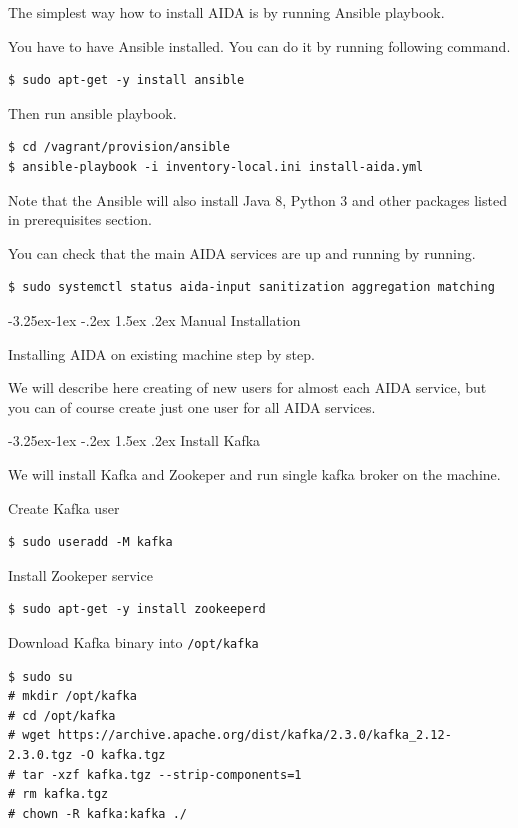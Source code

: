 \documentclass[a4paper]{article} %
\makeatletter
\renewcommand{\normalsize}{\fontsize{12}{15}\selectfont\color{textcolor}}
\renewcommand\subsection{\@startsection{subsection}{2}{\z@}%
                   {-3.25ex\@plus -1ex \@minus -.2ex}%
                   {1.5ex \@plus .2ex}%
                   {\normalfont\sffamily\large\bfseries\color{projectcolor}}}
\renewcommand\subsubsection{\@startsection{subsubsection}{3}{\z@}%
                   {-3.25ex\@plus -1ex \@minus -.2ex}%
                   {1.5ex \@plus .2ex}%
                   {\normalfont\normalsize\sffamily\bfseries\color{projectcolor}}}
\makeatother
\begin{document}
The simplest way how to install AIDA is by running Ansible playbook.

You have to have Ansible installed. You can do it by running following command.

\begin{lstlisting}
$ sudo apt-get -y install ansible
\end{lstlisting}

Then run ansible playbook.

\begin{lstlisting}
$ cd /vagrant/provision/ansible
$ ansible-playbook -i inventory-local.ini install-aida.yml
\end{lstlisting}

Note that the Ansible will also install Java 8, Python 3 and other packages listed in prerequisites section.

You can check that the main AIDA services are up and running by running.
\begin{lstlisting}
$ sudo systemctl status aida-input sanitization aggregation matching
\end{lstlisting}



\subsection{Manual Installation}

Installing AIDA on existing machine step by step.

We will describe here creating of new users for almost each AIDA service, but you can of course create just one user for
all AIDA services.


\subsubsection{Install Kafka}

We will install Kafka and Zookeper and run single kafka broker on the machine.

Create Kafka user
\begin{lstlisting}
$ sudo useradd -M kafka
\end{lstlisting}

Install Zookeper service
\begin{lstlisting}
$ sudo apt-get -y install zookeeperd
\end{lstlisting}

Download Kafka binary into \texttt{/opt/kafka}
\begin{lstlisting}
$ sudo su
# mkdir /opt/kafka
# cd /opt/kafka
# wget https://archive.apache.org/dist/kafka/2.3.0/kafka_2.12-2.3.0.tgz -O kafka.tgz
# tar -xzf kafka.tgz --strip-components=1
# rm kafka.tgz
# chown -R kafka:kafka ./
\end{lstlisting}
\end{document}
